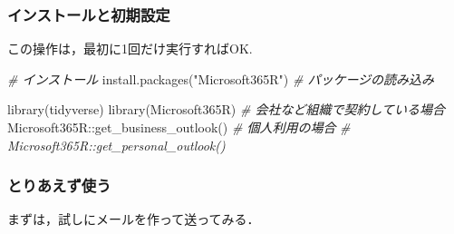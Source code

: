 \documentclass[
]{article}
\newenvironment{Shaded}{\begin{snugshade}}{\end{snugshade}}
\newcommand{\CommentTok}[1]{\textcolor[rgb]{0.56,0.35,0.01}{\textit{#1}}}
\newcommand{\FunctionTok}[1]{\textcolor[rgb]{0.00,0.00,0.00}{#1}}
\newcommand{\NormalTok}[1]{#1}
\newcommand{\SpecialCharTok}[1]{\textcolor[rgb]{0.00,0.00,0.00}{#1}}
\newcommand{\StringTok}[1]{\textcolor[rgb]{0.31,0.60,0.02}{#1}}
\begin{document}
\hypertarget{ux30a4ux30f3ux30b9ux30c8ux30fcux30ebux3068ux521dux671fux8a2dux5b9a}{%
\subsubsection{インストールと初期設定}\label{ux30a4ux30f3ux30b9ux30c8ux30fcux30ebux3068ux521dux671fux8a2dux5b9a}}

この操作は，最初に1回だけ実行すればOK.

\begin{Shaded}
\begin{Highlighting}[]
  \CommentTok{\# インストール}
\FunctionTok{install.packages}\NormalTok{(}\StringTok{"Microsoft365R"}\NormalTok{)}
  \CommentTok{\# パッケージの読み込み}
\end{Highlighting}
\end{Shaded}

\begin{Shaded}
\begin{Highlighting}[]
\FunctionTok{library}\NormalTok{(tidyverse)}
\FunctionTok{library}\NormalTok{(Microsoft365R)}
 \CommentTok{\# 会社など組織で契約している場合}
\NormalTok{Microsoft365R}\SpecialCharTok{::}\FunctionTok{get\_business\_outlook}\NormalTok{()}
 \CommentTok{\# 個人利用の場合}
  \CommentTok{\# Microsoft365R::get\_personal\_outlook()}
\end{Highlighting}
\end{Shaded}

\hypertarget{ux3068ux308aux3042ux3048ux305aux4f7fux3046}{%
\subsubsection{とりあえず使う}\label{ux3068ux308aux3042ux3048ux305aux4f7fux3046}}

まずは，試しにメールを作って送ってみる．
\end{document}
